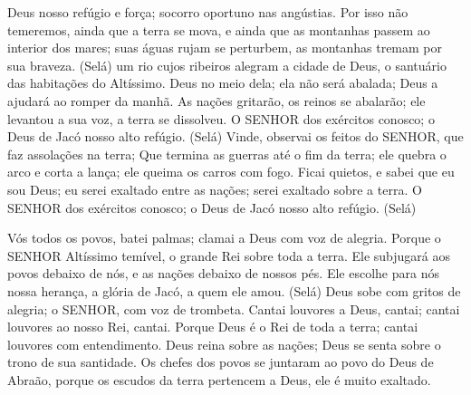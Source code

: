 {\PP 
  Deus
{} nosso refúgio e força; socorro oportuno nas angústias.
  Por isso não temeremos, ainda que a terra se mova, e ainda que as montanhas passem ao interior dos mares;
   suas águas rujam
{} se perturbem,
{} as montanhas tremam por sua braveza. (Selá)
   um rio cujos ribeiros alegram a cidade de Deus, o santuário das habitações do Altíssimo.
  Deus
{} no meio dela; ela não será abalada; Deus a ajudará ao romper da manhã.
  As nações gritarão, os reinos se abalarão;
{} ele levantou a sua voz, a terra se dissolveu.
  O SENHOR dos exércitos
{} conosco; o Deus de Jacó
{} nosso alto refúgio. (Selá)
  Vinde, observai os feitos do SENHOR, que faz assolações na terra;
  Que termina as guerras até o fim da terra; ele quebra o arco e corta a lança; ele queima os carros com fogo.
  Ficai quietos, e sabei que eu sou Deus; eu serei exaltado entre as nações; serei exaltado sobre a terra.
  O SENHOR dos exércitos
{} conosco; o Deus de Jacó
{} nosso alto refúgio. (Selá)
\par }


{\PP 
  Vós todos os povos, batei palmas; clamai a Deus com voz de alegria.
  Porque o SENHOR Altíssimo
{} temível, o grande Rei sobre toda a terra.
  Ele subjugará aos povos debaixo de nós, e as nações debaixo de nossos pés.
  Ele escolhe para nós nossa herança, a glória de Jacó, a quem ele amou. (Selá)
  Deus sobe com gritos de alegria; o SENHOR, com voz de trombeta.
  Cantai louvores a Deus, cantai; cantai louvores ao nosso Rei, cantai.
  Porque Deus é o Rei de toda a terra; cantai louvores com entendimento.
  Deus reina sobre as nações; Deus se senta sobre o trono de sua santidade.
  Os chefes dos povos se juntaram ao povo do Deus de Abraão, porque os escudos da terra pertencem a Deus,
{} ele é muito exaltado.
\par }


